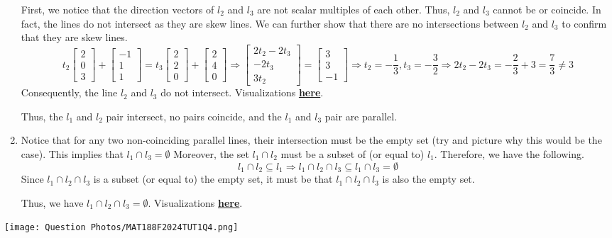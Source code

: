 \begin{SaveQuestion}
\begin{enumerate}
        First, we notice that the direction vectors of $l_2$ and $l_3$ are not scalar multiples of each other. Thus, $l_2$ and $l_3$ cannot be  or coincide. In fact, the lines do not intersect as they are skew lines. We can further show that there are no intersections between $l_2$ and $l_3$ to confirm that they are skew lines. 
        $$t_2 \begin{bmatrix} 2 \\ 0 \\ 3 \end{bmatrix} + \begin{bmatrix} -1 \\ 1 \\ 1 \end{bmatrix} = t_3 \begin{bmatrix} 2 \\ 2 \\ 0 \end{bmatrix} + \begin{bmatrix}  2 \\ 4 \\ 0 \end{bmatrix} \Longrightarrow \begin{bmatrix} 2t_2 - 2t_3 \\ -2t_3 \\ 3t_2 \end{bmatrix} = \begin{bmatrix} 3 \\ 3 \\ -1 \end{bmatrix} \Longrightarrow t_2 = -\frac{1}{3}, t_3 = -\frac{3}{2} \Longrightarrow 2t_2 - 2t_3 = -\frac{2}{3} + 3 = \frac{7}{3} \neq 3$$
        Consequently, the line $l_2$ and $l_3$ do not intersect. Visualizations \href{https://www.geogebra.org/3d/acpywquf}{\textbf{here}}.
        
        Thus, the $l_1$ and $l_2$ pair intersect, no pairs coincide, and the $l_1$ and $l_3$ pair are parallel. 
        \item Notice that for any two non-coinciding parallel lines, their intersection must be the empty set (try and picture why this would be the case). This implies that $l_1 \cap l_3 = \emptyset$ Moreover, the set $l_1 \cap l_2$ must be a subset of (or equal to) $l_1$. Therefore, we have the following.
        $$l_1 \cap l_2 \subseteq l_1 \Longrightarrow l_1 \cap l_2 \cap l_3 \subseteq l_1 \cap l_3 = \emptyset$$
        Since $l_1 \cap l_2 \cap l_3$ is a subset (or equal to) the empty set, it must be that $l_1 \cap l_2 \cap l_3$ is also the empty set. 

        Thus, we have $l_1 \cap l_2 \cap l_3 = \emptyset$. Visualizations \href{https://www.geogebra.org/3d/acpywquf}{\textbf{here}}.
    \end{enumerate}
    \begin{center}
        \texttt{[image: Question Photos/MAT188F2024TUT1Q4.png]}
    \end{center}
\end{SaveQuestion}

